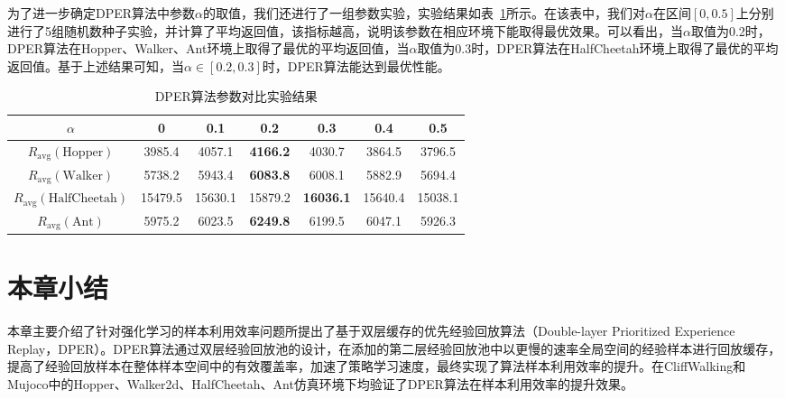 为了进一步确定DPER算法中参数$\alpha$的取值，我们还进行了一组参数实验，实验结果如表~\ref{tab:dper-ablation}所示。在该表中，我们对$\alpha$在区间$[0,0.5]$上分别进行了5组随机数种子实验，并计算了平均返回值，该指标越高，说明该参数在相应环境下能取得最优效果。可以看出，当$\alpha$取值为0.2时，DPER算法在Hopper、Walker、Ant环境上取得了最优的平均返回值，当$\alpha$取值为0.3时，DPER算法在HalfCheetah环境上取得了最优的平均返回值。基于上述结果可知，当$\alpha\in[0.2,0.3]$时，DPER算法能达到最优性能。

\begin{table}[ht]
\centering

\begin{tabular}{c|c|c|c|c|c|c} 
\toprule[2pt]
$\alpha$                           & 0       & 0.1     & 0.2             & 0.3              & 0.4     & 0.5      \\ 
\hline
$R_\text{avg}(\text{Hopper})$      & 3985.4  & 4057.1  & \textbf{4166.2} & 4030.7           & 3864.5  & 3796.5   \\ 
\hline
$R_\text{avg}(\text{Walker})$      & 5738.2  & 5943.4  & \textbf{6083.8} & 6008.1           & 5882.9  & 5694.4   \\ 
\hline
$R_\text{avg}(\text{HalfCheetah})$ & 15479.5 & 15630.1 & 15879.2         & \textbf{16036.1} & 15640.4 & 15038.1  \\ 
\hline
$R_\text{avg}(\text{Ant})$         & 5975.2  & 6023.5  & \textbf{6249.8} & 6199.5           & 6047.1  & 5926.3   \\
\bottomrule[2pt]
\end{tabular}

\caption{DPER算法参数对比实验结果}
\label{tab:dper-ablation}
\end{table}

\section{本章小结}

本章主要介绍了针对强化学习的样本利用效率问题所提出了基于双层缓存的优先经验回放算法（Double-layer Prioritized Experience Replay，DPER）。DPER算法通过双层经验回放池的设计，在添加的第二层经验回放池中以更慢的速率全局空间的经验样本进行回放缓存，提高了经验回放样本在整体样本空间中的有效覆盖率，加速了策略学习速度，最终实现了算法样本利用效率的提升。在CliffWalking和Mujoco中的Hopper、Walker2d、HalfCheetah、Ant仿真环境下均验证了DPER算法在样本利用效率的提升效果。